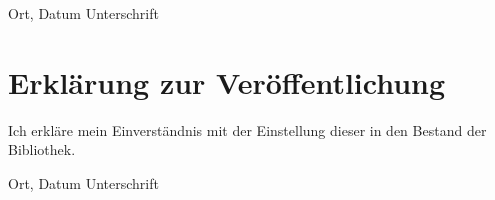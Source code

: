 \documentclass[12pt,final,twoside]{report}
\begin{document}
\vspace{4cm}
\noindent Ort, Datum \hfill Unterschrift

\newpage
\thispagestyle{empty}
\hspace{1cm}
\newpage

\vspace{2cm}
\chapter*{Erkl\"arung zur Ver\"offentlichung}
Ich erkl\"are mein Einverst\"andnis mit der Einstellung dieser \trtype{} in den Bestand der Bibliothek.

\vspace{4cm}
\noindent Ort, Datum \hfill Unterschrift

\newpage
\thispagestyle{empty}
\hspace{1cm}
\newpage
\end{document}
